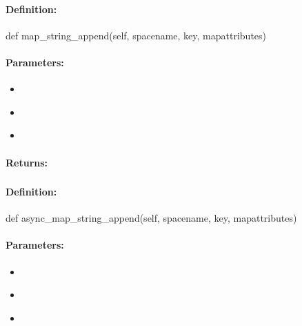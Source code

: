 \paragraph{Definition:}
\begin{pythoncode}
def map_string_append(self, spacename, key, mapattributes)
\end{pythoncode}

\paragraph{Parameters:}
\begin{itemize}[noitemsep]
\item {}\\

\item {}\\

\item {}\\

\end{itemize}

\paragraph{Returns:}


\pagebreak
\subsubsection{}
\label{api:python:async_map_string_append}


\paragraph{Definition:}
\begin{pythoncode}
def async_map_string_append(self, spacename, key, mapattributes)
\end{pythoncode}

\paragraph{Parameters:}
\begin{itemize}[noitemsep]
\item {}\\

\item {}\\

\item {}\\

\end{itemize}

